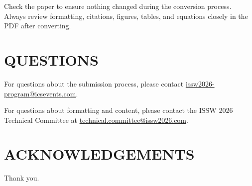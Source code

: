 \documentclass{issw}
\begin{document}
Check the paper to ensure nothing changed during the conversion process. Always review formatting, citations, figures, tables, and equations closely in the PDF after converting.

\section{QUESTIONS}
For questions about the submission process, please contact \href{mailto:issw2026-program@icsevents.com}{issw2026-program@icsevents.com}.

For questions about formatting and content, please contact the ISSW 2026 Technical Committee at \href{mailto:technical.committee@issw2026.com}{technical.committee@issw2026.com}.

{}
\section*{ACKNOWLEDGEMENTS}
Thank you.

\printbibliography[title={REFERENCES}]
\end{document}
